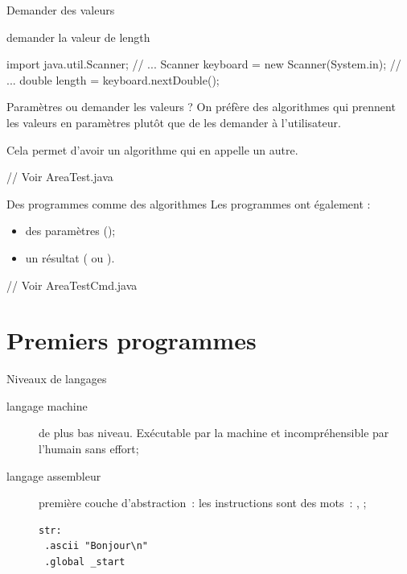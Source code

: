 \begin{hideedit}
\begin{frame}[fragile]{Demander des valeurs}
\begin{langagenaturel}
    demander la valeur de length
  \end{langagenaturel}

  \pause
  \begin{java}
import java.util.Scanner;
// ...
Scanner keyboard = new Scanner(System.in);
// ...
double length = keyboard.nextDouble();
  \end{java}
\end{frame}

\begin{frame}[fragile]{Paramètres ou demander les valeurs ?}
  On préfère des algorithmes qui prennent les valeurs en paramètres plutôt que
  de les demander à l'utilisateur.

  Cela permet d'avoir un \alert{algorithme qui en appelle un autre}.

  \vfill

  \pause
  \begin{java}
    // Voir AreaTest.java
  \end{java}
\end{frame}

\begin{frame}[fragile]{Des programmes comme des algorithmes}
  Les programmes ont également :
  \begin{itemize}
    \item des paramètres ();
    \item un résultat ( ou ).
  \end{itemize}

  \vfill

  \pause
  \begin{java}
    // Voir AreaTestCmd.java
  \end{java}
\end{frame}

\section{Premiers programmes}
\frame{\sectionpage}
\begin{frame}[fragile]{Niveaux de langages}
  \begin{description}
    \item[langage machine]
      de plus bas niveau. Exécutable par la machine et incompréhensible
      par l'humain sans effort;

    \item[langage assembleur]
      première couche d'abstraction~: les instructions
      sont des mots~: , ;
      {\footnotesize
      \begin{verbatim}
str:
 .ascii "Bonjour\n"
 .global _start


\end{verbatim}}
\end{description}
\end{frame}
\end{hideedit}
